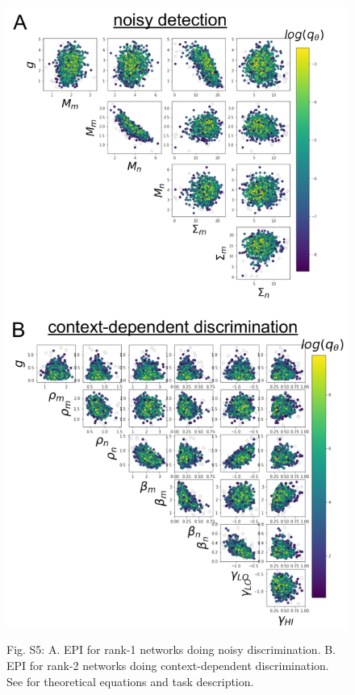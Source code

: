 \documentclass[11pt]{article}
\begin{document}
\begin{figure}
\begin{center}
\includegraphics[scale=0.5]{figures/figS5/figS5.pdf}
\end{center}
{\small Fig. S5: A. EPI for rank-1 networks doing noisy discrimination. B. EPI for rank-2 networks doing context-dependent discrimination.  See \cite{mastrogiuseppe2018linking} for theoretical equations and task description.}
\end{figure}
\end{document}
